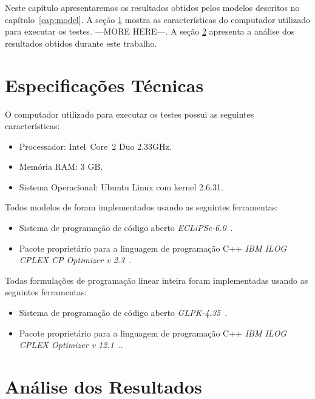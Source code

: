 Neste capítulo apresentaremos os resultados obtidos pelos modelos
descritos no capítulo~\ref{cap:model}. A seção \ref{sec:tspec} mostra
as características do computador utilizado para executar os
testes. ---MORE HERE---. A seção \ref{sec:analise} apresenta a análise dos
resultados obtidos durante este trabalho.

\section{Especificações Técnicas}
\label{sec:tspec}
O computador utilizado para executar os testes possui as seguintes
características:

\begin{itemize}
  \item{Processador: Intel\textregistered{}~Core\texttrademark~2 Duo
  2.33GHz.}

  \item{Memória RAM: 3 GB.}
  
  \item{Sistema Operacional: Ubuntu Linux com kernel 2.6.31.}
\end{itemize}

Todos modelos de \pr{} foram implementados usando as seguintes
ferramentas:

\begin{itemize}
  \item{Sistema de programação de código
  aberto \textit{ECLiPSe-6.0}~\cite{eclipse*2009}. } 
  
 \item{Pacote proprietário para a linguagem de programação
  C++ \textit{IBM\textregistered{} ILOG\textregistered{}
  CPLEX\textregistered{} CP Optimizer v 2.3}~\cite{ilogcp*2011}.}
\end{itemize}

Todas formulações de programação linear inteira foram implementadas
usando as seguintes ferramentas:

\begin{itemize}
  \item{Sistema de programação de código
  aberto \textit{GLPK-4.35}~\cite{glpk*2010}.}
  
  \item{Pacote proprietário para a linguagem de programação
  C++ \textit{IBM\textregistered{} ILOG\textregistered{}
  CPLEX\textregistered{} Optimizer v 12.1}~\cite{ilogcplex*2011}..}
\end{itemize}


\section{Análise dos Resultados}
\label{sec:analise}








